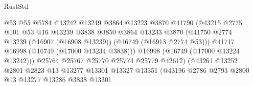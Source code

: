 \begin{lexlean}{RustStd}
\begin{coremodule}
                                        @53
                                        @55
                                        @5784
                                        @13242
                                        @13249
                                        @3864
                                        @13223
                                        @3870
                                        @41790
                                        (@43215
                                          @2775
                                          @101
                                          @53
                                          @16
                                          @13239
                                          @3838
                                          @3850
                                          @3864
                                          @13233
                                          @3870
                                          (@41750
                                            @2774
                                            @13239
                                            (@16907 (@16908 @13239))
                                            (@16749 (@16913 @2774 @53)))
                                          @41717
                                          @16998
                                          (@16749 (@17000 @13234 @3838)))
                                        @16998
                                        (@16749 (@17000 @13224 @13242)))
                                      @25764
                                      @25767
                                      @25770
                                      @25774
                                      @25779
                                      @42612)
                                    (@43261
                                      @13252
                                      @2801
                                      @2823
                                      @13
                                      @13277
                                      @13301
                                      @13327
                                      @13351
                                      (@43196
                                        @2786
                                        @2793
                                        @2800
                                        @13
                                        @13277
                                        @13286
                                        @3838
                                        @13301

\end{coremodule}
\end{lexlean}
